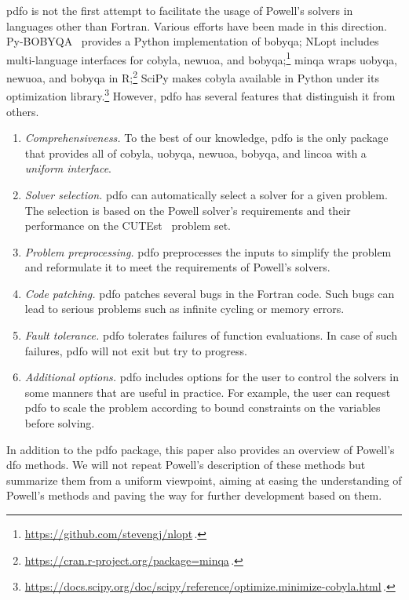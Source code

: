 \documentclass[
    smallextended,  %
    final,          %
]{svjour3}
\newcommand{\modified}[1]{\texorpdfstring{{\color{RoyalBlue}#1}}{#1}}
\begin{document}
\Gls{pdfo} is not the first attempt to facilitate the usage of Powell's solvers in languages other than Fortran.
Various efforts have been made in this direction.
Py-BOBYQA~\cite{Cartis_Etal_2019,Cartis_Roberts_Sheridan-Methven_2022} provides a Python implementation of \gls{bobyqa}; NLopt includes multi-language interfaces for \gls{cobyla}, \gls{newuoa}, and \gls{bobyqa};\footnote{\url{https://github.com/stevengj/nlopt}\,.} minqa wraps \gls{uobyqa}, \gls{newuoa}, and \gls{bobyqa} in R;\footnote{\url{https://cran.r-project.org/package=minqa}\,.} SciPy makes \gls{cobyla} available in Python under its optimization library.\footnote{\url{https://docs.scipy.org/doc/scipy/reference/optimize.minimize-cobyla.html}\,.}
However, \gls{pdfo} has several features that distinguish it from others.
\begin{enumerate}
    \item \emph{Comprehensiveness.}
        To the best of our knowledge, \gls{pdfo} is the only package that provides all of \gls{cobyla}, \gls{uobyqa}, \gls{newuoa}, \gls{bobyqa}, and \gls{lincoa} with a \emph{uniform interface}.
    \item \emph{Solver selection.}
        \Gls{pdfo} can automatically select a solver for a given problem.
        The selection \modified{is based on the Powell solver's requirements and their performance} on the CUTEst~\cite{Gould_Orban_Toint_2015} problem set.
    \item \emph{Problem preprocessing.}
        \Gls{pdfo} preprocesses the inputs to simplify the problem and reformulate it to meet the requirements of Powell's solvers.
    \item \emph{Code patching.}
        \Gls{pdfo} patches several bugs in the Fortran code.
        Such bugs can lead to serious problems such as infinite cycling or memory errors.
    \item \emph{Fault tolerance.}
        \Gls{pdfo} tolerates failures of function evaluations.
        In case of such failures, \gls{pdfo} will not exit but try to progress.
    \item \emph{Additional options.}
        \gls{pdfo} includes options for the user to control the solvers in some manners that are useful in practice.
        For example, the user can request \gls{pdfo} to scale the problem according to bound constraints on the variables before solving.
\end{enumerate}

In addition to the \gls{pdfo} package, this paper also provides an overview of Powell's \gls{dfo} methods.
We will not repeat Powell's description of these methods but summarize them from a uniform viewpoint, aiming at easing the understanding of Powell's methods and paving the way for further development based on them.
\end{document}
